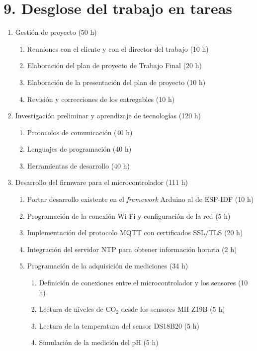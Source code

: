 \documentclass[
11pt, %
]{charter}
\begin{document}
\section{9. Desglose del trabajo en tareas}
\label{sec:wbs}
\begin{enumerate}
	\item Gestión de proyecto (50 h)
	\begin{enumerate}
		\item Reuniones con el cliente y con el director del trabajo (10 h)
		\item Elaboración del plan de proyecto de Trabajo Final (20 h)
		\item Elaboración de la presentación del plan de proyecto (10 h)
		\item Revisión y correcciones de los entregables (10 h)
	\end{enumerate}
	\item Investigación preliminar y aprendizaje de tecnologías (120 h)
	\begin{enumerate}
		\item Protocolos de comunicación (40 h)
		\item Lenguajes de programación (40 h)
		\item Herramientas de desarrollo (40 h)
	\end{enumerate}
		\item Desarrollo del firmware para el microcontrolador (111 h)
	\begin{enumerate}
		\item Portar desarrollo existente en el \textit{framework} Arduino al de ESP-IDF (10 h)
		\item Programación de la conexión Wi-Fi y configuración de la red (5 h)
		\item Implementación del protocolo MQTT con certificados SSL/TLS (20 h)
		\item Integración del servidor NTP para obtener información horaria (2 h)
		\item Programación de la adquisición de mediciones (34 h)
		\begin{enumerate}[label*=\arabic*.,ref=\theenumii.\arabic*]
			\item Definición de conexiones entre el microcontrolador y los sensores (10 h)
			\item Lectura de niveles de CO$_2$ desde los sensores MH-Z19B (5 h)
			\item Lectura de la temperatura del sensor DS18B20 (5 h)
			\item Simulación de la medición del pH (5 h)

\end{enumerate}
\end{enumerate}
\end{enumerate}
\end{document}
